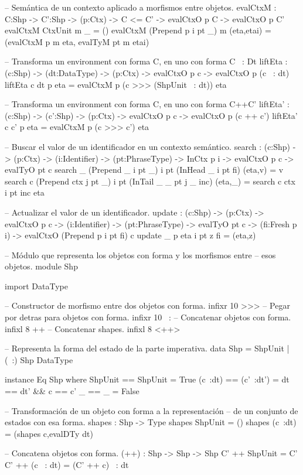\begin{code}
-- Semántica de un contexto aplicado a morfismos entre objetos.
evalCtxM : {C:Shp} -> {C':Shp} -> 
           (p:Ctx) -> C <= C' -> evalCtxO p C -> evalCtxO p C'
evalCtxM CtxUnit m _ = ()
evalCtxM (Prepend p i pt _) m (eta,etai) = (evalCtxM p m eta, evalTyM pt m etai)

-- Transforma un environment con forma C, en uno con forma C ~: Dt
liftEta : (c:Shp) -> (dt:DataType) -> (p:Ctx) -> 
          evalCtxO p c -> evalCtxO p (c ~: dt)
liftEta c dt p eta = evalCtxM p (c >>> (ShpUnit ~: dt)) eta

-- Transforma un environment con forma C, en uno con forma C++C'
liftEta' : (c:Shp) -> (c':Shp) -> (p:Ctx) -> evalCtxO p c -> 
           evalCtxO p (c ++ c')
liftEta' c c' p eta = evalCtxM p (c >>> c') eta

-- Buscar el valor de un identificador en un contexto semántico.
search : (c:Shp) -> (p:Ctx) -> (i:Identifier) -> (pt:PhraseType) ->
         InCtx p i -> evalCtxO p c -> evalTyO pt c
search _ (Prepend _ i pt _) i pt (InHead _ i pt fi) (eta,v) = v
search c (Prepend ctx j pt _) i pt (InTail _ _ pt j _ inc) (eta,_) = search c ctx i pt inc eta

-- Actualizar el valor de un identificador.
update : (c:Shp) -> (p:Ctx) -> evalCtxO p c -> (i:Identifier) -> 
         (pt:PhraseType) -> evalTyO pt c -> (fi:Fresh p i) -> evalCtxO (Prepend p i pt fi) c
update _ p eta i pt z fi = (eta,z)

-- Módulo que representa los objetos con forma y los morfismos entre
-- esos objetos.
module Shp

import DataType

-- Constructor de morfismo entre dos objetos con forma.
infixr 10 >>>
-- Pegar por detras para objetos con forma.
infixr 10 ~:
-- Concatenar objetos con forma.
infixl 8 ++
-- Concatenar shapes.
infixl 8 <++>

-- Representa la forma del estado de la parte imperativa.
data Shp = ShpUnit | (~:) Shp DataType

instance Eq Shp where
    ShpUnit == ShpUnit = True
    (c~:dt) == (c'~:dt') = dt == dt' && c == c'
    _ == _ = False

-- Transformación de un objeto con forma a la representación
-- de un conjunto de estados con esa forma.
shapes : Shp -> Type
shapes ShpUnit = ()
shapes (c~:dt) = (shapes c,evalDTy dt)

-- Concatena objetos con forma.
(++) : Shp -> Shp -> Shp
C' ++ ShpUnit = C'
C' ++ (c ~: dt) = (C' ++ c) ~: dt


\end{code}
